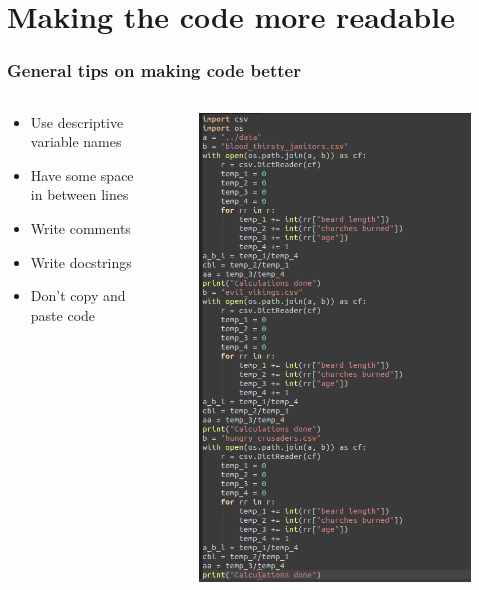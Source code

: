 \section[Code guidelines]{Making the code more readable}
\begin{frame}
	\frametitle{General tips on making code better}
	\begin{columns}
		\begin{column}{0.5\textwidth}
			\begin{itemize}
				\item Use descriptive variable names
				\item Have some space in between lines
				\item Write comments
				\item Write docstrings
				\item Don't copy and paste code
			\end{itemize}
		\end{column}
		\begin{column}{0.5\textwidth}
			\begin{figure}
					\includegraphics[width=\textwidth]{./pictures/stupid_file.png}

\end{figure}
\end{column}
\end{columns}
\end{frame}
